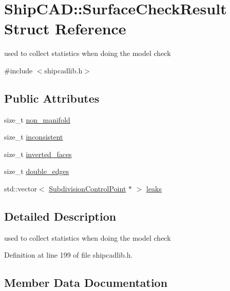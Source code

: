 \hypertarget{structShipCAD_1_1SurfaceCheckResult}{}\section{Ship\+C\+AD\+:\+:Surface\+Check\+Result Struct Reference}
\label{structShipCAD_1_1SurfaceCheckResult}


used to collect statistics when doing the model check  




{\ttfamily \#include $<$shipcadlib.\+h$>$}

\subsection*{Public Attributes}
\begin{DoxyCompactItemize}
\item 
size\+\_\+t \hyperlink{structShipCAD_1_1SurfaceCheckResult_a781d013ead5911ba9646334c00686985}{non\+\_\+manifold}
\item 
size\+\_\+t \hyperlink{structShipCAD_1_1SurfaceCheckResult_ac5c4a6c0d87e8020e469f4c06bd8c50d}{inconsistent}
\item 
size\+\_\+t \hyperlink{structShipCAD_1_1SurfaceCheckResult_a80e73423275a12c1047605ceb59829d6}{inverted\+\_\+faces}
\item 
size\+\_\+t \hyperlink{structShipCAD_1_1SurfaceCheckResult_ac9cd6a616b54cdfc8f2de4260810e751}{double\+\_\+edges}
\item 
std\+::vector$<$ \hyperlink{classShipCAD_1_1SubdivisionControlPoint}{Subdivision\+Control\+Point} $\ast$ $>$ \hyperlink{structShipCAD_1_1SurfaceCheckResult_ac9e1040a8818a6ecb98ab8981115deeb}{leaks}
\end{DoxyCompactItemize}


\subsection{Detailed Description}
used to collect statistics when doing the model check 

Definition at line 199 of file shipcadlib.\+h.



\subsection{Member Data Documentation}
